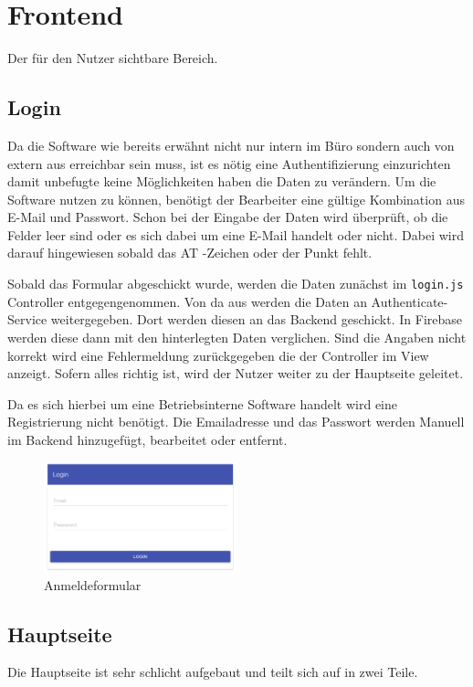 \section{Frontend}
Der für den Nutzer sichtbare Bereich.
\subsection{Login}
Da die Software wie bereits erwähnt nicht nur intern im Büro sondern auch von extern aus erreichbar sein muss, ist es nötig eine Authentifizierung einzurichten damit unbefugte keine Möglichkeiten haben die Daten zu verändern. Um die Software nutzen zu können, benötigt der Bearbeiter eine gültige Kombination aus E-Mail und Passwort. Schon bei der Eingabe der Daten wird überprüft, ob die Felder leer sind oder es sich dabei um eine E-Mail handelt oder nicht. Dabei wird darauf hingewiesen sobald das AT -Zeichen oder der Punkt fehlt. 

Sobald das Formular abgeschickt wurde, werden die Daten zunächst im \texttt{login.js} Controller entgegengenommen. Von da aus werden die Daten an Authenticate-Service weitergegeben. Dort werden diesen an das Backend geschickt. In Firebase werden diese dann mit den hinterlegten Daten verglichen. Sind die Angaben nicht korrekt wird eine Fehlermeldung zurückgegeben die der Controller im View anzeigt. Sofern alles richtig ist, wird der Nutzer weiter zu der Hauptseite geleitet. 

Da es sich hierbei um eine Betriebsinterne Software handelt wird eine Registrierung nicht benötigt. Die Emailadresse und das Passwort werden Manuell im Backend hinzugefügt, bearbeitet oder entfernt. 

\begin{figure}[H]
\centering\includegraphics[width=0.5\textwidth]{images/frontend_login.png}
\caption{Anmeldeformular}
\label{frontend_login}
\end{figure}

\subsection{Hauptseite}
Die Hauptseite ist sehr schlicht aufgebaut und teilt sich auf in zwei Teile. 

